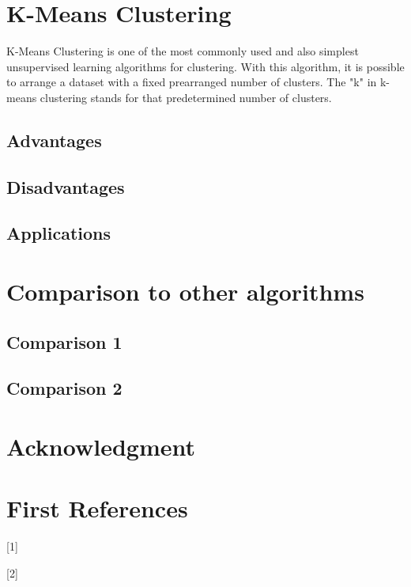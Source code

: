 \documentclass[conference]{IEEEtran}
\begin{document}
\section{K-Means Clustering}

K-Means Clustering is one of the most commonly used and also simplest unsupervised learning algorithms for clustering. With this algorithm, it is possible to arrange a dataset with a fixed prearranged number of clusters. The "k" in k-means clustering stands for that predetermined number of clusters.
\subsection{Advantages}

\subsection{Disadvantages}

\subsection{Applications}

\section{Comparison to other algorithms}

\subsection{Comparison 1}

\subsection{Comparison 2}

\section*{Acknowledgment}

\section{First References}

[1] \cite{madhulatha2012overview}

[2] \cite{muller2016introduction}


\end{document}
